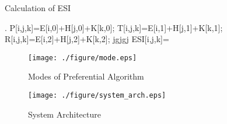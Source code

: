 \documentclass[3p,times]{elsarticle}
\begin{document}
\makeatletter
\def\BState{\State\hskip-\ALG@thistlm}
\makeatother
{}
\begin{algorithm}[]

\caption{Calculation of ESI}
\label{Algorithm:ESI}
\begin{algorithmic}[1]
\Procedure{}{}
\For {}
             \For {}
                 \For {}.
                     \State P[i,j,k]=E[i,0]+H[j,0]+K[k,0];
                     \State T[i,j,k]=E[i,1]+H[j,1]+K[k,1];
                     \State R[i,j,k]=E[i,2]+H[j,2]+K[k,2];
                \EndFor
            \EndFor
    \EndFor
\State
\if
\State jgjgj
\fi
\For {}
             \For {}
                 \For {}
 \State ESI[i,j,k]=
\If {} 
\State 
\State 
\State 
\State 
\State 
\State 
\EndIf
                  \EndFor
            \EndFor
    \EndFor


  
\EndProcedure

\Statex

\end{algorithmic}


\end{algorithm}




\begin{figure}[!hp]
\centering
\vspace{-9pt}
\texttt{[image: ./figure/mode.eps]}
\vspace{-6pt}
\caption{Modes of Preferential Algorithm}
\label{fig:mode_fig}
\end{figure}
 
\begin{figure}[!hp]
\centering
\vspace{1pt}
\texttt{[image: ./figure/system\_arch.eps]}
\vspace{-6pt}
\caption{System Architecture}
\vspace{8pt}
\label{fig:system_arch_fig}
\end{figure}
\end{document}
